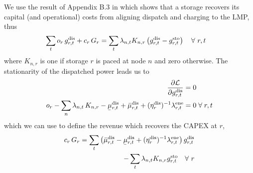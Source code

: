 \documentclass[11pt,twocolumn]{article}
\newcommand{\ubar}[1]{\underaccent{\bar}{#1}}
\newcommand{\Forall}[1]{\hspace{10pt} \forall \,\, #1 }
\newcommand{\pdv}[2]{\frac{\partial #1}{\partial #2}}
\newcommand{\storage}{g_{r,t}}
\newcommand{\storagedispatch}{\storage^\text{dis}}
\newcommand{\storagecharge}{\storage^\text{sto}}
\newcommand{\storagesoc}{\storage^\text{ene}}
\newcommand{\efficiency}{\eta_{r}}
\newcommand{\efficiencydispatch}{\efficiency^\text{dis}}
\newcommand{\efficiencycharge}{\efficiency^\text{sto}}
\newcommand{\efficiencysoc}{\efficiency^\text{ene}}
\newcommand{\operationalpricestorage}{o_r}
\newcommand{\capitalpricestorage}{c_r}
\newcommand{\capacitystorage}{G_r}
\newcommand{\mulowerstoragedispatch}{\ubar{\mu}_{r,t}^\text{dis}}
\newcommand{\muupperstoragedispatch}{\bar{\mu}_{r,t}^\text{dis}}
\newcommand{\mulowerstoragecharge}{\ubar{\mu}_{r,t}^\text{sto}}
\newcommand{\muupperstoragecharge}{\bar{\mu}_{r,t}^\text{sto}}
\newcommand{\mulowerstoragesoc}{\ubar{\mu}_{r,t}^\text{ene}}
\newcommand{\muupperstoragesoc}{\bar{\mu}_{r,t}^\text{ene}}
\newcommand{\mustateofcharge}{\lambda^\text{ene}_{r,t}}
\newcommand{\munextstateofcharge}{\lambda^\text{ene}_{r,t+1}}
\newcommand{\lagrangian}{\mathcal{L}}
\newcommand{\lmp}[1][n]{\lambda_{#1,t}}
\newcommand{\incidencestorage}[1][n]{K_{#1,r}}
\begin{document}
We use the result of Appendix B.3 in \cite{brown_decreasing_2020} which shows that a storage recovers its capital (and operational) costs from aligning dispatch and charging to the LMP, thus
\begin{align}
    \notag
    \sum_t \operationalpricestorage \, \storagedispatch + \capitalpricestorage \, \capacitystorage = \sum_t \lmp \incidencestorage & \left(\storagedispatch - \storagecharge \right) \Forall{r,t}
\end{align}
where $\incidencestorage$ is one if storage $r$ is paced at node $n$ and zero otherwise.
The stationarity of the dispatched power leads us to
\begin{align}
    \notag
    \pdv{\lagrangian}{\storagedispatch}                                                                                                                            & = 0                   \\
    \operationalpricestorage - \sum_n \lmp \, \incidencestorage - \mulowerstoragedispatch + \muupperstoragedispatch + (\efficiencydispatch )^{-1} \mustateofcharge & = 0 \;  \forall\; r,t
    \label{eq:stationarity_storagedispatch}
\end{align}
which we  can use to define the revenue which recovers the \ac{CAPEX} at $r$,
\begin{align}
    \notag
    \capitalpricestorage \, \capacitystorage = \sum_t \left(\muupperstoragedispatch - \mulowerstoragedispatch  + (\efficiencydispatch )^{-1} \mustateofcharge \right) \storagedispatch \\
    - \sum_t \lmp \incidencestorage  \storagecharge \Forall{r}
    \label{eq:no_profit_capex_storage2}
\end{align}

\end{document}
